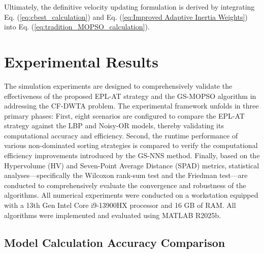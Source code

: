 \documentclass[lettersize,journal]{IEEEtran}
\begin{document}
Ultimately, the definitive velocity updating formulation is derived by integrating Eq. (\ref{eq:cbest_calculation}) and Eq. (\ref{eq:Improved Adaptive Inertia Weights}) into Eq. (\ref{eq:tradition_MOPSO_calculation}).



\section{Experimental Results}

The simulation experiments are designed to comprehensively validate the effectiveness of the proposed EPL-AT strategy and the GS-MOPSO algorithm in addressing the CF-DWTA problem. The experimental framework unfolds in three primary phases: First, eight scenarios are configured to compare the EPL-AT strategy against the LBP and Noisy-OR models, thereby validating its computational accuracy and efficiency. Second, the runtime performance of various non-dominated sorting strategies is compared to verify the computational efficiency improvements introduced by the GS-NNS method. Finally, based on the Hypervolume (HV) and Seven-Point Average Distance (SPAD) metrics, statistical analyses—specifically the Wilcoxon rank-sum test and the Friedman test—are conducted to comprehensively evaluate the convergence and robustness of the algorithms. All numerical experiments were conducted on a workstation equipped with a 13th Gen Intel Core i9-13900HX processor and 16 GB of RAM. All algorithms were implemented and evaluated using MATLAB R2025b.


\subsection{Model Calculation Accuracy Comparison}
\end{document}
